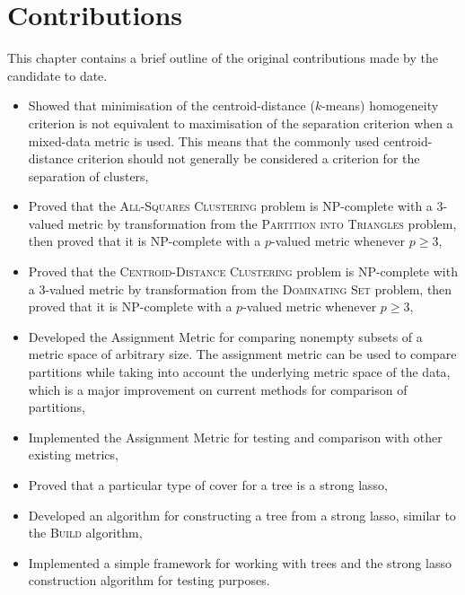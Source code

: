 \chapter{Contributions}
\label{cha:contributions}

This chapter contains a brief outline of the original contributions made by
the candidate to date.
\begin{itemize}
\item Showed that minimisation of the centroid-distance ($k$-means)
  homogeneity criterion is not equivalent to maximisation of the separation
  criterion when a mixed-data metric is used.  This means that the commonly
  used centroid-distance criterion should not generally be considered a
  criterion for the separation of clusters,
\item Proved that the \textsc{All-Squares Clustering} problem is NP-complete
  with a 3-valued metric by transformation from the \textsc{Partition into
    Triangles} problem, then proved that it is NP-complete with a $p$-valued
  metric whenever $p\geq 3$,
\item Proved that the \textsc{Centroid-Distance Clustering} problem is
  NP-complete with a 3-valued metric by transformation from the
  \textsc{Dominating Set} problem, then proved that it is NP-complete with a
  $p$-valued metric whenever $p\geq 3$,
\item Developed the Assignment Metric for comparing nonempty subsets of a
  metric space of arbitrary size.  The assignment metric can be used to
  compare partitions while taking into account the underlying metric space of
  the data, which is a major improvement on current methods for comparison of
  partitions,
\item Implemented the Assignment Metric for testing and comparison with other
  existing metrics,
\item Proved that a particular type of cover for a tree is a strong lasso,
\item Developed an algorithm for constructing a tree from a strong lasso,
  similar to the \textsc{Build} algorithm,
\item Implemented a simple framework for working with trees and the strong
  lasso construction algorithm for testing purposes.
\end{itemize}

